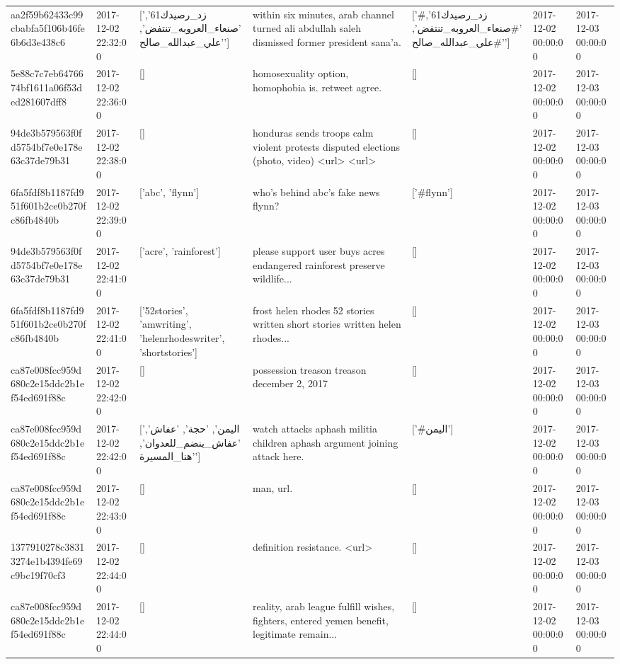 \begin{tabular}{lllllll}
aa2f59b62433c99cbabfa5f106b46fe6b6d3e438c6 & 2017-12-02 22:32:00 & ['زد_رصيدك61', 'صنعاء_العروبه_تنتفض', 'علي_عبدالله_صالح'] & within six minutes, arab channel turned ali abdullah saleh dismissed former president sana'a. & ['#زد_رصيدك61', '#صنعاء_العروبه_تنتفض', '#علي_عبدالله_صالح'] & 2017-12-02 00:00:00 & 2017-12-03 00:00:00 \\
5e88c7c7eb6476674bf1611a06f53ded281607dff8 & 2017-12-02 22:36:00 & [] & homosexuality option, homophobia is. retweet agree. & [] & 2017-12-02 00:00:00 & 2017-12-03 00:00:00 \\
94de3b579563f0fd5754bf7e0e178e63c37de79b31 & 2017-12-02 22:38:00 & [] & honduras sends troops calm violent protests disputed elections (photo, video) <url> <url> & [] & 2017-12-02 00:00:00 & 2017-12-03 00:00:00 \\
6fa5fdf8b1187fd951f601b2ce0b270fc86fb4840b & 2017-12-02 22:39:00 & ['abc', 'flynn'] & who's behind abc's fake news flynn? & ['#flynn'] & 2017-12-02 00:00:00 & 2017-12-03 00:00:00 \\
94de3b579563f0fd5754bf7e0e178e63c37de79b31 & 2017-12-02 22:41:00 & ['acre', 'rainforest'] & please support user buys acres endangered rainforest preserve wildlife... & [] & 2017-12-02 00:00:00 & 2017-12-03 00:00:00 \\
6fa5fdf8b1187fd951f601b2ce0b270fc86fb4840b & 2017-12-02 22:41:00 & ['52stories', 'amwriting', 'helenrhodeswriter', 'shortstories'] & frost helen rhodes 52 stories written short stories written helen rhodes... & [] & 2017-12-02 00:00:00 & 2017-12-03 00:00:00 \\
ca87e008fcc959d680c2e15ddc2b1ef54ed691f88c & 2017-12-02 22:42:00 & [] & possession treason treason december 2, 2017 & [] & 2017-12-02 00:00:00 & 2017-12-03 00:00:00 \\
ca87e008fcc959d680c2e15ddc2b1ef54ed691f88c & 2017-12-02 22:42:00 & ['اليمن', 'حجة', 'عفاش', 'عفاش_ينضم_للعدوان', 'هنا_المسيرة'] & watch attacks aphash militia children aphash argument joining attack here. & ['#اليمن'] & 2017-12-02 00:00:00 & 2017-12-03 00:00:00 \\
ca87e008fcc959d680c2e15ddc2b1ef54ed691f88c & 2017-12-02 22:43:00 & [] & man, url. & [] & 2017-12-02 00:00:00 & 2017-12-03 00:00:00 \\
1377910278c38313274e1b4394fe69c9bc19f70cf3 & 2017-12-02 22:44:00 & [] & definition resistance. <url> & [] & 2017-12-02 00:00:00 & 2017-12-03 00:00:00 \\
ca87e008fcc959d680c2e15ddc2b1ef54ed691f88c & 2017-12-02 22:44:00 & [] & reality, arab league fulfill wishes, fighters, entered yemen benefit, legitimate remain... & [] & 2017-12-02 00:00:00 & 2017-12-03 00:00:00 \\

\end{tabular}
